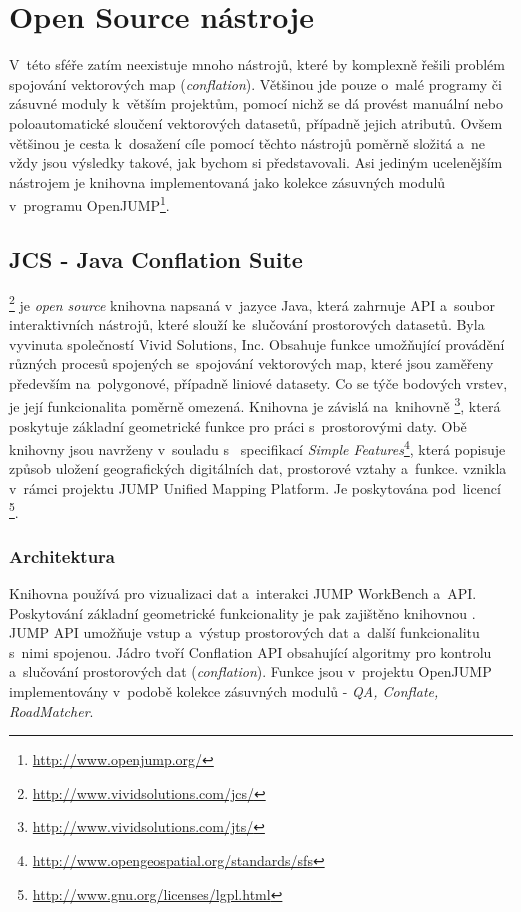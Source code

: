 \section{Open Source nástroje}
\label{open-source}

V~této sféře zatím neexistuje mnoho nástrojů, které by komplexně řešili problém
spojování vektorových map (\textit{conflation}). Většinou jde pouze o~malé 
programy či zásuvné moduly k~větším projektům, pomocí nichž se dá provést manuální
nebo poloautomatické sloučení vektorových datasetů, případně jejich atributů. 
Ovšem většinou je cesta k~dosažení cíle pomocí těchto nástrojů poměrně složitá 
a~ne vždy jsou výsledky takové, jak bychom si představovali. Asi jediným 
ucelenějším nástrojem je knihovna  implementovaná jako kolekce 
zásuvných modulů v~programu OpenJUMP\footnote{\url{http://www.openjump.org/}}.


\subsection{JCS - Java Conflation Suite}
\label{jcs}

\footnote{\url{http://www.vividsolutions.com/jcs/}} je \textit{open source}
knihovna napsaná v~jazyce Java, která zahrnuje API a~soubor interaktivních nástrojů, 
které slouží ke~slučování prostorových datasetů. Byla vyvinuta společností Vivid 
Solutions, Inc. Obsahuje funkce umožňující provádění různých procesů spojených 
se~spojování vektorových map, které jsou zaměřeny především na~polygonové, případně 
liniové datasety. Co se týče bodových vrstev, je její funkcionalita poměrně omezená. 
Knihovna  je závislá na~knihovně 
\footnote{\url{http://www.vividsolutions.com/jts/}}, která poskytuje 
základní geometrické funkce pro práci s~prostorovými daty. Obě knihovny jsou navrženy 
v~souladu s~ specifikací 
\textit{Simple Features}\footnote{\url{http://www.opengeospatial.org/standards/sfs}}, 
která popisuje způsob uložení geografických digitálních dat, prostorové vztahy 
a~funkce.  vznikla v~rámci projektu JUMP Unified Mapping Platform. Je 
poskytována pod~licencí 
\footnote{\url{http://www.gnu.org/licenses/lgpl.html}}.

\subsubsection{Architektura}

Knihovna  používá pro vizualizaci dat a~interakci JUMP WorkBench
a~API. Poskytování základní geometrické funkcionality je pak zajištěno 
knihovnou . JUMP API umožňuje vstup a~výstup prostorových dat 
a~další funkcionalitu s~nimi spojenou. Jádro  tvoří Conflation API
obsahující algoritmy pro kontrolu a~slučo\-vání prostorových dat 
(\textit{conflation}). Funkce  jsou v~projektu OpenJUMP 
implementovány v~podobě kolekce zásuvných modulů - \textit{QA, Conflate, 
RoadMatcher}.

